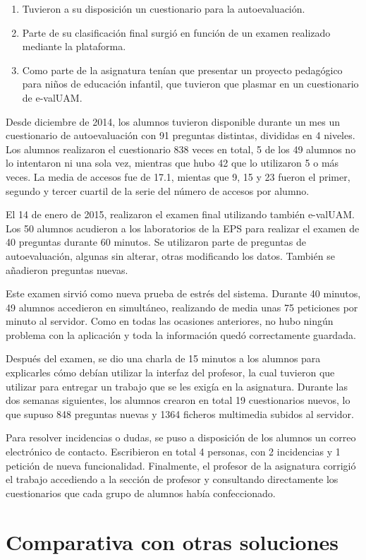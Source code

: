 \begin{enumerate}
 	\item Tuvieron a su disposición un cuestionario para la autoevaluación. 
 	\item Parte de su clasificación final surgió en función de un examen realizado mediante la plataforma. 
 	\item Como parte de la asignatura tenían que presentar un proyecto pedagógico para niños de educación infantil, que tuvieron que plasmar en un cuestionario de \acrshort{e-valUAM}. 
\end{enumerate}

Desde diciembre de 2014, los alumnos tuvieron disponible durante un mes un cuestionario de autoevaluación con 91 preguntas distintas, divididas en 4 niveles. Los alumnos realizaron el cuestionario 838 veces en total, 5 de los 49 alumnos no lo intentaron ni una sola vez, mientras que hubo 42 que lo utilizaron 5 o más veces. La media de accesos fue de 17.1, mientas que 9, 15 y 23 fueron el primer, segundo y tercer cuartil de la serie del número de accesos por alumno.

El 14 de enero de 2015, realizaron el examen final utilizando también \acrshort{e-valUAM}. Los 50 alumnos acudieron a los laboratorios de la EPS para realizar el examen de 40 preguntas durante 60 minutos. Se utilizaron parte de preguntas de autoevaluación, algunas sin alterar, otras modificando los datos. También se añadieron preguntas nuevas.

Este examen sirvió como nueva prueba de estrés del sistema. Durante 40 minutos, 49 alumnos accedieron en simultáneo, realizando de media unas 75 peticiones por minuto al servidor. Como en todas las ocasiones anteriores, no hubo ningún problema con la aplicación y toda la información quedó correctamente guardada.

Después del examen, se dio una charla de 15 minutos a los alumnos para explicarles cómo debían utilizar la interfaz del profesor, la cual tuvieron que utilizar para entregar un trabajo que se les exigía en la asignatura. Durante las dos semanas siguientes, los alumnos crearon en total 19 cuestionarios nuevos, lo que supuso 848 preguntas nuevas y 1364 ficheros multimedia subidos al servidor. 

Para resolver incidencias o dudas, se puso a disposición de los alumnos un correo electrónico de contacto. Escribieron en total 4 personas, con 2 incidencias y 1 petición de nueva funcionalidad. Finalmente, el profesor de la asignatura corrigió el trabajo accediendo a la sección de profesor y consultando directamente los cuestionarios que cada grupo de alumnos había confeccionado.



\section{Comparativa con otras soluciones}